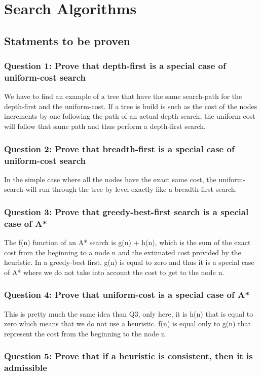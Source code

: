 \documentclass[a4paper,10pt]{article}
\begin{document}
	\newpage
	
	\section{Search Algorithms}
		\subsection{Statments to be proven}
			\subsubsection{Question 1: Prove that depth-first is a special case of uniform-cost search}
				We have to find an example of a tree that have the same search-path for the depth-first and the uniform-cost. If a tree is build is such as the cost of the nodes increments by one following the path of an actual depth-search, the uniform-cost will follow that same path and thus perform a depth-first search. 
				
			\subsubsection{Question 2: Prove that breadth-first is a special case of uniform-cost search}	
				In the simple case where all the nodes have the exact same cost, the uniform-search will run through the tree by level exactly like a breadth-first search.
			\subsubsection{Question 3: Prove that greedy-best-first search is a special case of A*}
				The f(n) function of an A* search is g(n) + h(n), which is the sum of the exact cost from the beginning to a node n and the extimated cost provided by the heuristic. In a greedy-best first, g(n) is equal to zero and thus it is a special case of A* where we do not take into account the cost to get to the node n. 
			\subsubsection{Question 4: Prove that uniform-cost is a special case of A*}
				This is pretty much the same idea than Q3, only here, it is h(n) that is equal to zero which means that we do not use a heuristic. f(n) is equal only to g(n) that represent the cost from the beginning to the node n.\\
			
			\subsubsection{Question 5: Prove that if a heuristic is consistent, then it is admissible}
			
\end{document}
